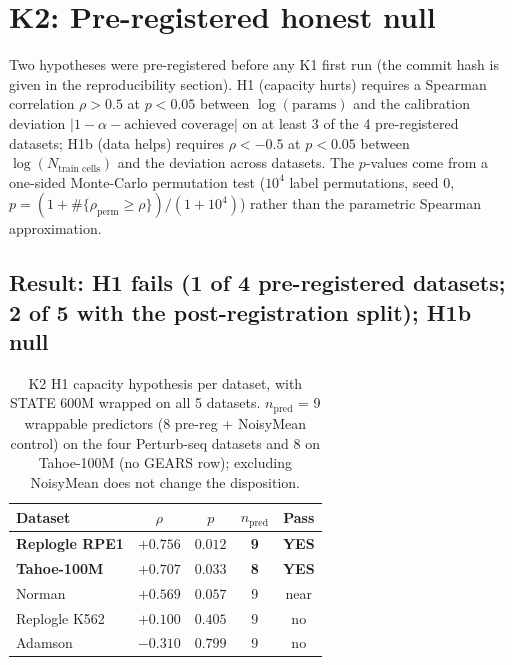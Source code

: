\documentclass{article}
\begin{document}
\section{K2: Pre-registered honest null}

Two hypotheses were pre-registered before any K1 first run (the commit hash is given in the reproducibility section). H1 (capacity hurts) requires a Spearman correlation $\rho > 0.5$ at $p < 0.05$ between $\log(\text{params})$ and the calibration deviation $|1 - \alpha - \text{achieved coverage}|$ on at least 3 of the 4 pre-registered datasets; H1b (data helps) requires $\rho < -0.5$ at $p < 0.05$ between $\log(N_{\text{train cells}})$ and the deviation across datasets. The $p$-values come from a one-sided Monte-Carlo permutation test ($10^4$ label permutations, seed $0$, $p = (1 + \#\{\rho_{\text{perm}} \geq \rho\})/(1 + 10^4)$) rather than the parametric Spearman approximation.

\subsection{Result: H1 fails (1 of 4 pre-registered datasets; 2 of 5 with the post-registration split); H1b null}

\begin{table}[h]
\caption{K2 H1 capacity hypothesis per dataset, with STATE 600M wrapped on all 5 datasets. $n_{\text{pred}}$ = 9 wrappable predictors (8 pre-reg + NoisyMean control) on the four Perturb-seq datasets and 8 on Tahoe-100M (no GEARS row); excluding NoisyMean does not change the disposition.}
\label{tab:k2}
\vskip 0.1in
\begin{center}
\begin{small}
\begin{tabular}{lcccc}
\toprule
Dataset & $\rho$ & $p$ & $n_{\text{pred}}$ & Pass \\
\midrule
\textbf{Replogle RPE1} & $\mathbf{+0.756}$ & $\mathbf{0.012}$ & \textbf{9} & \textbf{YES} \\
\textbf{Tahoe-100M} & $\mathbf{+0.707}$ & $\mathbf{0.033}$ & \textbf{8} & \textbf{YES} \\
Norman & $+0.569$ & $0.057$ & 9 & near \\
Replogle K562 & $+0.100$ & $0.405$ & 9 & no \\
Adamson & $-0.310$ & $0.799$ & 9 & no \\
\bottomrule
\end{tabular}
\end{small}
\end{center}
\vskip -0.1in
\end{table}
\end{document}
